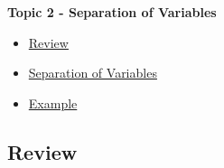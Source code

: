 \documentclass[fleqn]{beamer} %
\newcommand{\sectionIItitle}{Separation of Variables}
\newcommand{\sectionIIsubsectionItitle}{Review}
\newcommand{\sectionIIsubsectionIItitle}{Separation of Variables}
\newcommand{\sectionIIsubsectionIIItitle}{Example}
\begin{document}
		\begin{frame}
			\large \textbf{Topic 2 - \sectionIItitle} \vspace{3mm}\\

			\begin{itemize}
				\item \hyperlink{sectionIIsubsectionI}{\sectionIIsubsectionItitle} \vspc %
				\item \hyperlink{sectionIIsubsectionII}{\sectionIIsubsectionIItitle} \vspc %
				\item \hyperlink{sectionIIsubsectionIII}{\sectionIIsubsectionIIItitle} \vspc %
			\end{itemize}

		\end{frame}

		\subsection{\sectionIIsubsectionItitle}\label{sectionIIsubsectionI}
\end{document}
